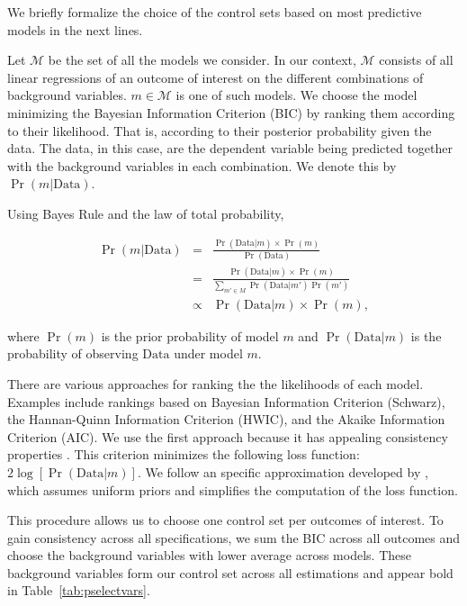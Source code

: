 \singlespacing

\doublespacing

\noindent We briefly formalize the choice of the control sets based on most predictive models in the next lines.

\noindent Let $\mathcal{M}$ be the set of all the models we consider. In our context, $\mathcal{M}$ consists of all linear regressions of an outcome of interest on the different combinations of background variables. $m \in \mathcal{M}$ is one of such models. We choose the model minimizing the Bayesian Information Criterion (BIC) by ranking them according to their likelihood. That is, according to their posterior probability given the data. The data, in this case, are the dependent variable being predicted together with the background variables in each combination. We denote this by $\Pr( m | \text{Data} )$.

\noindent Using Bayes Rule and the law of total probability,

\begin{eqnarray}
\Pr( m | \text{Data} ) &=& \frac{\Pr(\text{Data} | m)\times \Pr(m)}{ \Pr(\text{Data})}\\ \nonumber
&=& \frac{\Pr(\text{Data} | m)\times \Pr(m)}{\sum \limits _{m' \in M} \Pr (\text{Data} | m') \Pr(m')} \\ \nonumber
&\propto& \Pr (\text{Data} | m) \times \Pr(m),
\end{eqnarray}

\noindent where $\Pr(m)$ is the prior probability of model $m$ and $\Pr(\text{Data} | m)$ is the probability of observing $\text{Data}$ under model $m$.

\noindent There are various approaches for ranking the the likelihoods of each model. Examples include rankings based on Bayesian Information Criterion (Schwarz), the Hannan-Quinn Information Criterion (HWIC), and the Akaike Information Criterion (AIC). We use the first approach because it has appealing consistency properties \citep{Diebold_2007_Forecasting}. This criterion minimizes the following loss function: $2 \log [\Pr( \text{Data} | m)]$. We follow an specific approximation developed by \citet{Claeskens-Hjort_2008_Model-Selection}, which assumes uniform priors and simplifies the computation of the loss function.

\noindent This procedure allows us to choose one control set per outcomes of interest. To gain consistency across all specifications, we sum the BIC across all outcomes and choose the background variables with lower average across models. These background variables form our control set across all estimations and appear bold in Table~\ref{tab:pselectvars}.

